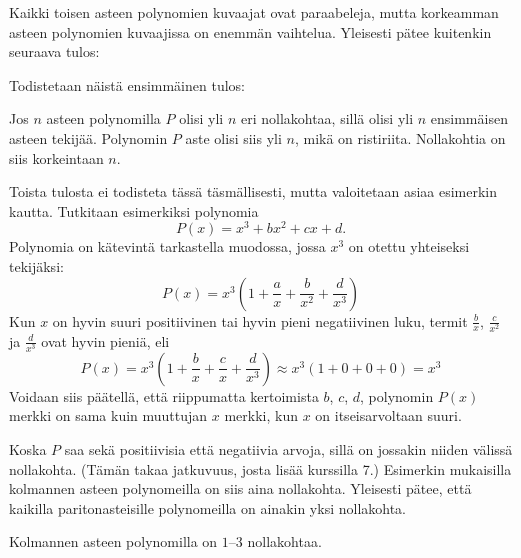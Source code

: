 
Kaikki toisen asteen polynomien kuvaajat ovat paraabeleja, mutta korkeamman asteen polynomien kuvaajissa on enemmän vaihtelua. Yleisesti pätee kuitenkin seuraava tulos:


Todistetaan näistä ensimmäinen tulos:

\begin{todistus}
Jos $n$ asteen polynomilla $P$ olisi yli $n$ eri nollakohtaa, sillä olisi yli $n$ ensimmäisen asteen tekijää. Polynomin $P$ aste olisi siis yli $n$, mikä on ristiriita. Nollakohtia on siis korkeintaan $n$.
\end{todistus}

Toista tulosta ei todisteta tässä täsmällisesti, mutta valoitetaan asiaa esimerkin kautta. Tutkitaan esimerkiksi polynomia 
$$P(x)=x^3+bx^2+cx+d.$$
Polynomia on kätevintä tarkastella muodossa, jossa $x^3$ on otettu yhteiseksi tekijäksi:
$$P(x) = x^3\left(1+\frac{a}{x}+\frac{b}{x^2}+\frac{d}{x^3}\right)$$
Kun $x$ on hyvin suuri positiivinen tai hyvin pieni negatiivinen luku,
termit $\frac{b}{x}$, $\frac{c}{x^2}$ ja $\frac{d}{x^3}$ ovat hyvin pieniä, eli
\[P(x) = x^3\left(1+\frac{b}{x}+\frac{c}{x}+\frac{d}{x^3}\right) \approx  x^3\left(1+0+0+0\right) = x^3\]
Voidaan siis päätellä, että riippumatta kertoimista $b$, $c$, $d$, polynomin $P(x)$ merkki on sama kuin muuttujan $x$ merkki, kun $x$ on itseisarvoltaan suuri.

Koska $P$ saa sekä positiivisia että negatiivia arvoja, sillä on jossakin niiden välissä nollakohta. (Tämän takaa jatkuvuus, josta lisää kurssilla 7.) Esimerkin mukaisilla kolmannen asteen polynomeilla on siis aina nollakohta. Yleisesti pätee, että kaikilla paritonasteisille polynomeilla on ainakin yksi nollakohta.

\begin{esimerkki} Kolmannen asteen polynomilla on $1$--$3$ nollakohtaa.

\begin{lukusuora}{-2.5}{3}{3.6}
\lukusuoraisobbox
{}
\end{lukusuora}
\begin{lukusuora}{-2.8}{2.5}{3.6}
\lukusuoraisobbox
{}
\end{lukusuora}
\begin{lukusuora}{-2}{2}{3.6}
\lukusuoraisobbox
{}
\end{lukusuora}
\end{esimerkki}


